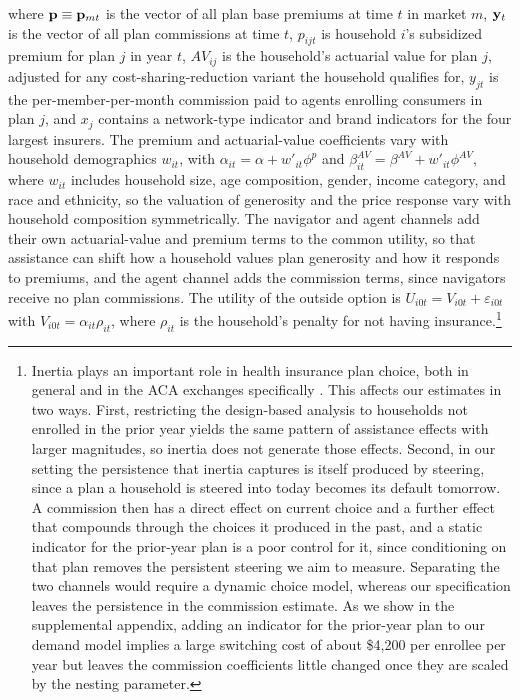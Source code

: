 \documentclass[12pt]{article}
\begin{document}
where ${\bf p} \equiv {\bf p}_{mt}$ is the vector of all plan base premiums at time $t$ in market $m$,  ${\bf y}_{t}$ is the vector of all plan commissions at time $t$, $p_{ijt}$ is household $i$'s subsidized premium for plan $j$ in year $t$, $AV_{ij}$ is the household's actuarial value for plan $j$, adjusted for any cost-sharing-reduction variant the household qualifies for, $y_{jt}$ is the per-member-per-month commission paid to agents enrolling consumers in plan $j$, and $x_{j}$ contains a network-type indicator and brand indicators for the four largest insurers. The premium and actuarial-value coefficients vary with household demographics $w_{it}$, with $\alpha_{it} = \alpha + w'_{it}\phi^{p}$ and $\beta^{AV}_{it} = \beta^{AV} + w'_{it}\phi^{AV}$, where $w_{it}$ includes household size, age composition, gender, income category, and race and ethnicity, so the valuation of generosity and the price response vary with household composition symmetrically. The navigator and agent channels add their own actuarial-value and premium terms to the common utility, so that assistance can shift how a household values plan generosity and how it responds to premiums, and the agent channel adds the commission terms, since navigators receive no plan commissions. The utility of the outside option is $U_{i0t} = V_{i0t} + \varepsilon_{i0t}$ with $V_{i0t} = \alpha_{it} \rho_{it}$, where $\rho_{it}$ is the household's penalty for not having insurance.\footnote{Inertia plays an important role in health insurance plan choice, both in general \citep{handel2013, polyakova2016} and in the ACA exchanges specifically \citep{saltzman2025}. This affects our estimates in two ways. First, restricting the design-based analysis to households not enrolled in the prior year yields the same pattern of assistance effects with larger magnitudes, so inertia does not generate those effects. Second, in our setting the persistence that inertia captures is itself produced by steering, since a plan a household is steered into today becomes its default tomorrow. A commission then has a direct effect on current choice and a further effect that compounds through the choices it produced in the past, and a static indicator for the prior-year plan is a poor control for it, since conditioning on that plan removes the persistent steering we aim to measure. Separating the two channels would require a dynamic choice model, whereas our specification leaves the persistence in the commission estimate. As we show in the supplemental appendix, adding an indicator for the prior-year plan to our demand model implies a large switching cost of about \$4,200 per enrollee per year but leaves the commission coefficients little changed once they are scaled by the nesting parameter.}
\end{document}
